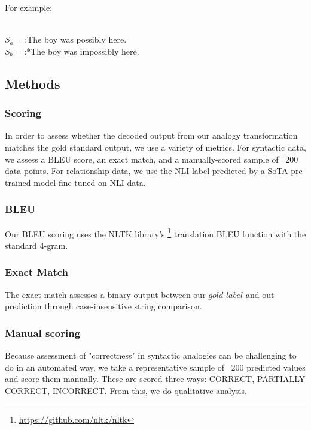 \documentclass[11pt]{article}
\begin{document}
 For example: \begin{center}\\$S_a=$:The boy was possibly here. \\ $S_b=$:*The boy was impossibly here.\\\end{center}
 

\subsection{Methods}

\subsubsection{Scoring}
In order to assess whether the decoded output from our analogy transformation matches the gold standard output, we use a variety of metrics. For syntactic data, we assess a BLEU score, an exact match, and a manually-scored sample of ~200 data points. For relationship data, we use the NLI label predicted by a SoTA pre-trained model fine-tuned on NLI data.

\subsubsection{BLEU}
Our BLEU scoring uses the NLTK library's \footnote{\href{https://github.com/nltk/nltk}{https://github.com/nltk/nltk}} translation BLEU function with the standard 4-gram.
\subsubsection{Exact Match}

The exact-match assesses a binary output between our $gold\_label$ and out prediction through case-insensitive string comparison.

\subsubsection{Manual scoring}
Because assessment of "correctness" in syntactic analogies can be challenging to do in an automated way, we take a representative sample of ~200 predicted values and score them manually. These are scored three ways: CORRECT, PARTIALLY CORRECT, INCORRECT. From this, we do qualitative analysis.
\end{document}
